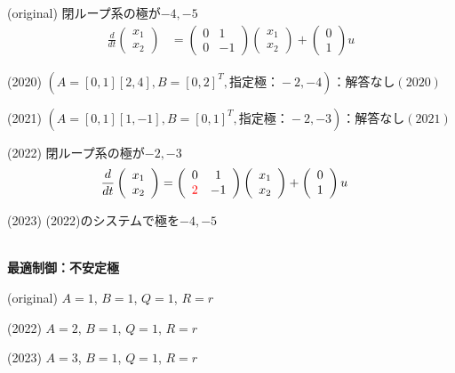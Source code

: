 \documentclass[a4paper,11pt,fleqn]{jreport}
\begin{document}
(original)
閉ループ系の極が$-4,-5$
\begin{align*}
	\frac{d}{dt}
	\left (
	\begin{array}{c}
	 x_1 \\ x_2 
	\end{array}
	\right )
	& = 
	\left (
	\begin{array}{cc}
	 0 & 1 \\
	 0 & -1
	\end{array}
	\right )
	\left (
	\begin{array}{c}
	 x_1 \\ x_2 
	\end{array}
	\right )
	+
	\left (
	\begin{array}{c}
	 0 \\ 1 
	\end{array}
	\right )
	u
\end{align*}

(2020) $(A=[0, 1][2, 4], B=[0, 2]^T, 指定極：-2,-4)：解答なし(2020) $

(2021) $(A=[0, 1][1, -1], B=[0, 1]^T, 指定極：-2,-3)：解答なし(2021)$

(2022)
閉ループ系の極が{\color{red}$-2,-3$}
\begin{align*}
	\frac{d}{dt}
	\left (
	\begin{array}{c}
	 x_1 \\ x_2 
	\end{array}
	\right )
	& = 
	\left (
	\begin{array}{cc}
	 0 & 1 \\
	 \color{red} 2 & -1
	\end{array}
	\right )
	\left (
	\begin{array}{c}
	 x_1 \\ x_2 
	\end{array}
	\right )
	+
	\left (
	\begin{array}{c}
	 0 \\ 1 
	\end{array}
	\right )
	u
\end{align*}

(2023) (2022)のシステムで極を{\color{red}$-4,-5$}



\ \\ \noindent
{\bf 最適制御：不安定極}

(original)
$A=1$, $B=1$, $Q=1$, $R=r$

(2022)
{\color{red}$A=2$}, $B=1$, $Q=1$, $R=r$

(2023)
{\color{red}$A=3$}, $B=1$, $Q=1$, $R=r$
\end{document}
